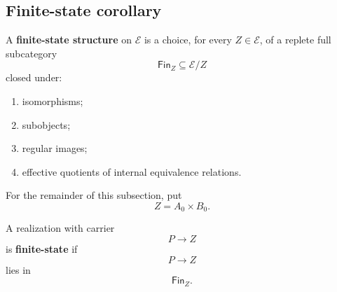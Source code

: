 \subsection{Finite-state corollary}
\label{subsec:finite-state-corollary}

\begin{definition}
\label{def:finite-state-doctrine}
    A \textbf{finite-state structure} on \(\mathcal E\) is a choice, for every \(Z\in\mathcal E\), of a replete full subcategory
    \[
        \mathsf{Fin}_Z\subseteq\mathcal E/Z
    \]
    closed under:
    \begin{enumerate}
        \item isomorphisms;

        \item subobjects;

        \item regular images;

        \item effective quotients of internal equivalence relations.
    \end{enumerate}
\end{definition}

For the remainder of this subsection, put
\[
    Z=A_0\times B_0.
\]

\begin{definition}
\label{def:finite-state-realization}
    A realization with carrier
    \[
        P\to Z
    \]
    is \textbf{finite-state} if
    \[
        P\to Z
    \]
    lies in
    \[
        \mathsf{Fin}_Z.
    \]
\end{definition}

